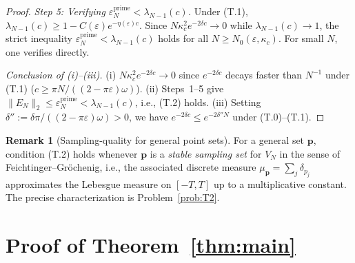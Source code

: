 \documentclass[12pt,a4paper]{amsart}
\theoremstyle{definition}
\newtheorem{remark}[theorem]{Remark}
\newcommand{\Kul}{\kappa_c}
\newcommand{\EN}{E_N}
\newcommand{\norm}[1]{\|#1\|}
\begin{document}
\begin{proof}
\textit{Step 5: Verifying $\varepsilon_N^{\mathrm{prime}}<\lambda_{N-1}(c)$.}
Under (T.1), $\lambda_{N-1}(c)\geq1-C(\varepsilon)e^{-\eta(\varepsilon)c}$.
Since $N\Kul^2 e^{-2\delta c}\to0$ while $\lambda_{N-1}(c)\to1$,
the strict inequality $\varepsilon_N^{\mathrm{prime}}<\lambda_{N-1}(c)$
holds for all $N\geq N_0(\varepsilon,\Kul)$.
For small $N$, one verifies directly.

\textit{Conclusion of (i)--(iii).}
(i) $N\Kul^2 e^{-2\delta c}\to0$ since $e^{-2\delta c}$ decays faster
than $N^{-1}$ under (T.1) ($c\geq\pi N/((2-\pi\varepsilon)\omega)$).
(ii) Steps~1--5 give $\norm{\EN}_2\leq\varepsilon_N^{\mathrm{prime}}
<\lambda_{N-1}(c)$, i.e., (T.2) holds.
(iii) Setting $\delta'':=\delta\pi/((2-\pi\varepsilon)\omega)>0$,
we have $e^{-2\delta c}\leq e^{-2\delta''N}$ under (T.0)--(T.1).
\end{proof}

\begin{remark}[Sampling-quality for general point sets]\label{rem:T2_general}
For a general set $\mathbf{p}$, condition (T.2) holds whenever
$\mathbf{p}$ is a \emph{stable sampling set} for $V_N$
in the sense of Feichtinger--Gr\"ochenig, i.e., the associated
discrete measure $\mu_{\mathbf{p}}=\sum_j\delta_{p_j}$ approximates
the Lebesgue measure on $[-T,T]$ up to a multiplicative constant.
The precise characterization is Problem~\ref{prob:T2}.
\end{remark}

\section{Proof of Theorem~\ref{thm:main}}\label{sec:proof}
\end{document}

